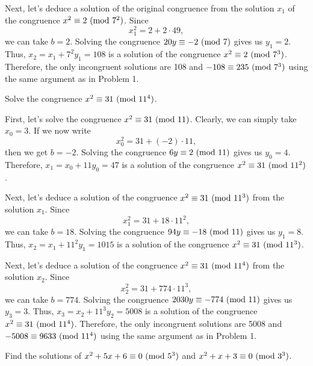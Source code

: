\begin{solution}
\begin{enumerate}
        Next, let's deduce a solution of the original congruence from the solution $x_1$ of the congruence $x^2 \equiv 2 \ (\mathrm{mod}\ 7^2)$. Since
        $$x_1^2 = 2 + 2\cdot 49,$$
        we can take $b = 2$. Solving the congruence $20y \equiv -2 \ (\mathrm{mod}\ 7)$ gives us $y_1 = 2$. Thus, $x_2 = x_1 + 7^2y_1 = 108$ is a solution of the congruence $x^2 \equiv 2 \ (\mathrm{mod}\ 7^3)$. Therefore, the only incongruent solutions are 108 and $-108 \equiv 235 \ (\mathrm{mod}\ 7^3)$ using the same argument as in Problem 1. \\
    \end{enumerate}
\end{solution}

\begin{exercise}
    Solve the congruence $x^2 \equiv 31 \ (\mathrm{mod}\ 11^4)$. \\
\end{exercise}

\begin{solution}
    First, let's solve the congruence $x^2 \equiv 31 \ (\mathrm{mod}\ 11)$. Clearly, we can simply take $x_0 = 3$. If we now write
    $$x_0^2 = 31 + (-2)\cdot 11,$$
    then we get $b = -2$. Solving the congruence $6y \equiv 2 \ (\mathrm{mod}\ 11)$ gives us $y_0 = 4$. Therefore, $x_1 = x_0 + 11y_0 = 47$ is a solution of the congruence $x^2 \equiv 31 \ (\mathrm{mod}\ 11^2)$.

    Next, let's deduce a solution of the congruence $x^2 \equiv 31 \ (\mathrm{mod}\ 11^3)$ from the solution $x_1$. Since
    $$x_1^2 = 31 + 18\cdot 11^2,$$
    we can take $b = 18$. Solving the congruence $94y \equiv -18 \ (\mathrm{mod}\ 11)$ gives us $y_1 = 8$. Thus, $x_2 = x_1 + 11^2y_1 = 1015$ is a solution of the congruence $x^2 \equiv 31 \ (\mathrm{mod}\ 11^3)$.
    
    Next, let's deduce a solution of the congruence $x^2 \equiv 31 \ (\mathrm{mod}\ 11^4)$ from the solution $x_2$. Since
    $$x_2^2 = 31 + 774\cdot 11^3,$$
    we can take $b = 774$. Solving the congruence $2030y \equiv -774 \ (\mathrm{mod}\ 11)$ gives us $y_3 = 3$. Thus, $x_3 = x_2 + 11^3y_2 = 5008$ is a solution of the congruence $x^2 \equiv 31 \ (\mathrm{mod}\ 11^4)$. Therefore, the only incongruent solutions are 5008 and $-5008 \equiv 9633 \ (\mathrm{mod}\ 11^4)$ using the same argument as in Problem 1.  \\
\end{solution}

\begin{exercise}
    Find the solutions of $x^2 + 5x + 6 \equiv 0 \ (\mathrm{mod}\ 5^3)$ and $x^2 + x + 3 \equiv 0 \ (\mathrm{mod}\ 3^3)$. \\
\end{exercise}

